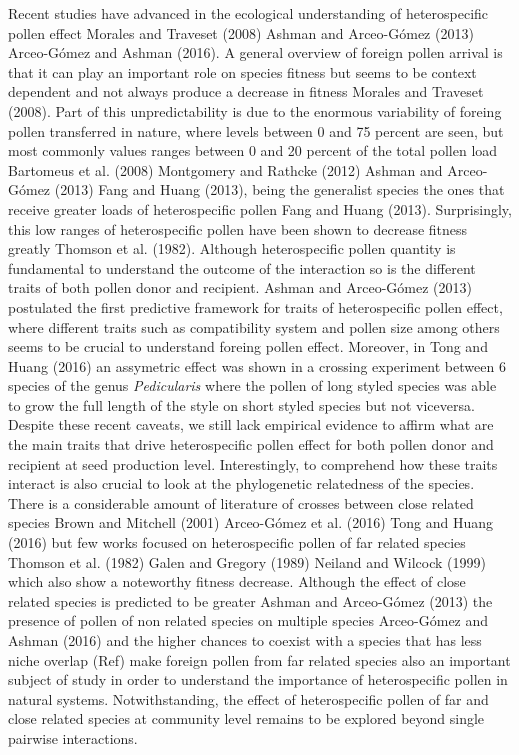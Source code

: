 \documentclass[11pt,a4paper]{article}
\begin{document}
Recent studies have advanced in the ecological understanding of
heterospecific pollen effect Morales and Traveset (2008) Ashman and
Arceo-Gómez (2013) Arceo-Gómez and Ashman (2016). A general overview of
foreign pollen arrival is that it can play an important role on species
fitness but seems to be context dependent and not always produce a
decrease in fitness Morales and Traveset (2008). Part of this
unpredictability is due to the enormous variability of foreing pollen
transferred in nature, where levels between 0 and 75 percent are seen,
but most commonly values ranges between 0 and 20 percent of the total
pollen load Bartomeus et al. (2008) Montgomery and Rathcke (2012) Ashman
and Arceo-Gómez (2013) Fang and Huang (2013), being the generalist
species the ones that receive greater loads of heterospecific pollen
Fang and Huang (2013). Surprisingly, this low ranges of heterospecific
pollen have been shown to decrease fitness greatly Thomson et al.
(1982). Although heterospecific pollen quantity is fundamental to
understand the outcome of the interaction so is the different traits of
both pollen donor and recipient. Ashman and Arceo-Gómez (2013)
postulated the first predictive framework for traits of heterospecific
pollen effect, where different traits such as compatibility system and
pollen size among others seems to be crucial to understand foreing
pollen effect. Moreover, in Tong and Huang (2016) an assymetric effect
was shown in a crossing experiment between 6 species of the genus
\emph{Pedicularis} where the pollen of long styled species was able to
grow the full length of the style on short styled species but not
viceversa. Despite these recent caveats, we still lack empirical
evidence to affirm what are the main traits that drive heterospecific
pollen effect for both pollen donor and recipient at seed production
level. Interestingly, to comprehend how these traits interact is also
crucial to look at the phylogenetic relatedness of the species. There is
a considerable amount of literature of crosses between close related
species Brown and Mitchell (2001) Arceo-Gómez et al. (2016) Tong and
Huang (2016) but few works focused on heterospecific pollen of far
related species Thomson et al. (1982) Galen and Gregory (1989) Neiland
and Wilcock (1999) which also show a noteworthy fitness decrease.
Although the effect of close related species is predicted to be greater
Ashman and Arceo-Gómez (2013) the presence of pollen of non related
species on multiple species Arceo-Gómez and Ashman (2016) and the higher
chances to coexist with a species that has less niche overlap (Ref) make
foreign pollen from far related species also an important subject of
study in order to understand the importance of heterospecific pollen in
natural systems. Notwithstanding, the effect of heterospecific pollen of
far and close related species at community level remains to be explored
beyond single pairwise interactions.
\end{document}
